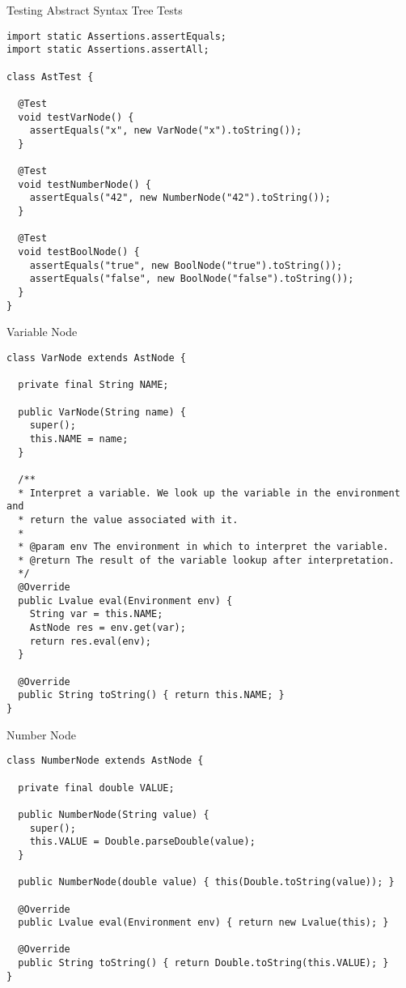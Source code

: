 \begin{cl}{Testing Abstract Syntax Tree Tests}
\begin{lstlisting}[language=MyJava]
import static Assertions.assertEquals;
import static Assertions.assertAll;

class AstTest {

  @Test
  void testVarNode() {
    assertEquals("x", new VarNode("x").toString());
  }

  @Test
  void testNumberNode() {
    assertEquals("42", new NumberNode("42").toString());
  }

  @Test
  void testBoolNode() {
    assertEquals("true", new BoolNode("true").toString());
    assertEquals("false", new BoolNode("false").toString());
  }  
}
\end{lstlisting}
\end{cl}

\begin{cl}{Variable Node}
\begin{lstlisting}[language=MyJava]
class VarNode extends AstNode {

  private final String NAME;

  public VarNode(String name) {
    super();
    this.NAME = name;
  }

  /**
  * Interpret a variable. We look up the variable in the environment and
  * return the value associated with it.
  *
  * @param env The environment in which to interpret the variable.
  * @return The result of the variable lookup after interpretation.
  */
  @Override
  public Lvalue eval(Environment env) {
    String var = this.NAME;
    AstNode res = env.get(var);
    return res.eval(env);
  }

  @Override
  public String toString() { return this.NAME; }
}
\end{lstlisting}
\end{cl}

\begin{cl}{Number Node}
\begin{lstlisting}[language=MyJava]
class NumberNode extends AstNode {

  private final double VALUE;

  public NumberNode(String value) {
    super();
    this.VALUE = Double.parseDouble(value);
  }

  public NumberNode(double value) { this(Double.toString(value)); }

  @Override
  public Lvalue eval(Environment env) { return new Lvalue(this); }

  @Override
  public String toString() { return Double.toString(this.VALUE); }
}
\end{lstlisting}
\end{cl}

